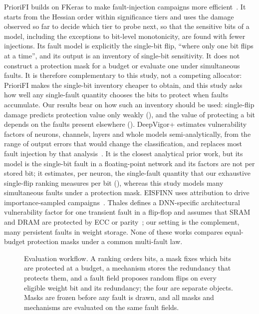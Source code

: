 PrioriFI builds on FKeras to make fault-injection campaigns more efficient~\cite{weng2026priorifi}. It starts from the Hessian order within significance tiers and uses the damage observed so far to decide which tier to probe next, so that the sensitive bits of a model, including the exceptions to bit-level monotonicity, are found with fewer injections. Its fault model is explicitly the single-bit flip, ``where only one bit flips at a time'', and its output is an inventory of single-bit sensitivity. It does not construct a protection mask for a budget or evaluate one under simultaneous faults. It is therefore complementary to this study, not a competing allocator: PrioriFI makes the single-bit inventory cheaper to obtain, and this study asks how well any single-fault quantity chooses the bits to protect when faults accumulate. Our results bear on how such an inventory should be used: single-flip damage predicts protection value only weakly (), and the value of protecting a bit depends on the faults present elsewhere (). DeepVigor+ estimates vulnerability factors of neurons, channels, layers and whole models semi-analytically, from the range of output errors that would change the classification, and replaces most fault injection by that analysis~\cite{ahmadilivani2024deepvigorplus}. It is the closest analytical prior work, but its model is the single-bit fault in a floating-point network and its factors are not per stored bit; it estimates, per neuron, the single-fault quantity that our exhaustive single-flip ranking measures per bit (), whereas this study models many simultaneous faults under a protection mask. EISFINN uses attribution to drive importance-sampled campaigns~\cite{colucci2024eisfinn}. Thales defines a DNN-specific architectural vulnerability factor for one transient fault in a flip-flop and assumes that SRAM and DRAM are protected by ECC or parity~\cite{tyagi2023thales}; our setting is the complement, many persistent faults in weight storage. None of these works compares equal-budget protection masks under a common multi-fault law.

\begin{figure}[t]
\centering
\caption{Evaluation workflow. A ranking orders bits, a mask fixes which bits are protected at a budget, a mechanism stores the redundancy that protects them, and a fault field proposes random flips on every eligible weight bit and its redundancy; the four are separate objects. Masks are frozen before any fault is drawn, and all masks and mechanisms are evaluated on the same fault fields.}
\label{fig:workflow}
\end{figure}

